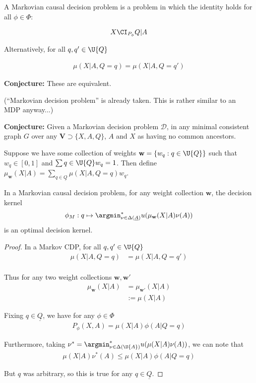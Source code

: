 A Markovian causal decision problem is a problem in which the identity holds for all $\phi\in \Phi$:

\begin{align}
    X\CI_{P_\phi} Q | A
\end{align}

Alternatively, for all $q,q'\in \U{Q}$

\begin{align}
    \mu(X|A,Q=q)=\mu(X|A,Q=q')
\end{align}

\textbf{Conjecture:} These are equivalent.

(``Markovian decision problem'' is already taken. This is rather similar to an MDP anyway...)

\textbf{Conjecture:} Given a Markovian decision problem $\mathscr{D}$, in any minimal consistent graph $G$ over any $\mathbf{V}\supset\{X,A,Q\}$, $A$ and $X$ as having no common ancestors.

Suppose we have some collection of weights $\mathbf{w}=\{w_q:q\in \U{Q}\}$ such that $w_q\in [0,1]$ and $\sum{q\in \U{Q}}w_q=1$. Then define $\mu_{\mathbf{w}}(X|A)=\sum_{q\in\underline{Q}} \mu(X|A,Q=q) w_q$.



\begin{lemma}
In a Markovian causal decision problem, for any weight collection $\mathbf{w}$, the decision kernel 
\begin{align}
    \phi_{M}: q\mapsto \argmin^*_{\nu\in \Delta(\underline{A})} u(\mu_{\mathbf{w}}(X|A)\nu(A)) 
\end{align}
is an optimal decision kernel.
\end{lemma}

\begin{proof}
In a Markov CDP, for all $q,q'\in\U{Q}$
\begin{align}
    \mu(X|A,Q=q) &= \mu(X|A,Q=q')\\
\end{align}

Thus for any two weight collections $\mathbf{w},\mathbf{w}'$
\begin{align}
    \mu_{\mathbf{w}}(X|A) &= \mu_{\mathbf{w}'}(X|A)\\
                          &:= \mu(X|A)
\end{align}

Fixing $q\in \underline{Q}$, we have for any $\phi\in \Phi$
\begin{align}
    P_\phi(X,A) = \mu(X|A)\phi(A|Q=q)
\end{align}

Furthermore, taking $\nu^* = \argmin^*_{\nu\in \Delta(\U{A})} u(\mu(X|A)\nu(A))$, we can note that
\begin{align}
    \mu(X|A)\nu^*(A) \leq \mu(X|A)\phi(A|Q=q)
\end{align}

But $q$ was arbitrary, so this is true for any $q\in \underline{Q}$.
\end{proof}

